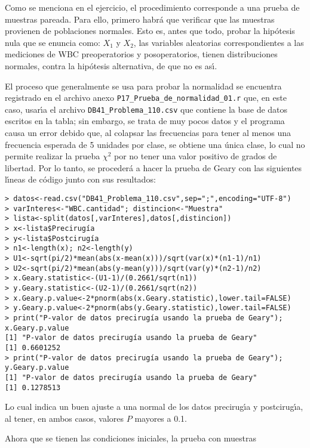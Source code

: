 \begin{solucion}
 Como se menciona en el ejercicio, el procedimiento corresponde
 a una prueba de muestras pareada.
 Para ello, primero habr\'a que verificar que las muestras provienen
 de poblaciones normales.
 Esto es, antes que todo, probar la hip\'otesis nula que se enuncia como: $X_1$ y $X_2$, las variables aleatorias correspondientes
 a las mediciones de WBC preoperatorios y posoperatorios,
 tienen distribuciones normales, contra la hip\'otesis alternativa,
 de que no es as\'{\i}.
 \par 
 El proceso que generalmente se usa para probar la normalidad 
 se encuentra registrado en el archivo anexo
 \texttt{P17\_Prueba\_de\_normalidad\_01.r}
 que, en este caso, usar\'{\i}a el archivo 
 \texttt{DB41\_Problema\_110.csv} que contiene la base de datos
 escritos en la tabla;
 sin embargo, se trata de muy pocos datos
 y el programa causa un error debido que,
 al colapsar las frecuencias para tener al menos una frecuencia esperada
 de 5 unidades por clase, se obtiene una \'unica clase,
 lo cual no permite realizar la prueba $\chi^2$
 por no tener una valor positivo de grados de libertad.
 Por lo tanto, se proceder\'a a hacer la prueba de Geary
 con las siguientes l\'{\i}neas de c\'odigo junto con sus resultados:
 \begin{verbatim}
> datos<-read.csv("DB41_Problema_110.csv",sep=";",encoding="UTF-8")
> varInteres<-"WBC.cantidad"; distincion<-"Muestra"
> lista<-split(datos[,varInteres],datos[,distincion])
> x<-lista$Precirugía
> y<-lista$Postcirugía
> n1<-length(x); n2<-length(y)
> U1<-sqrt(pi/2)*mean(abs(x-mean(x)))/sqrt(var(x)*(n1-1)/n1)
> U2<-sqrt(pi/2)*mean(abs(y-mean(y)))/sqrt(var(y)*(n2-1)/n2)
> x.Geary.statistic<-(U1-1)/(0.2661/sqrt(n1))
> y.Geary.statistic<-(U2-1)/(0.2661/sqrt(n2))
> x.Geary.p.value<-2*pnorm(abs(x.Geary.statistic),lower.tail=FALSE)
> y.Geary.p.value<-2*pnorm(abs(y.Geary.statistic),lower.tail=FALSE)
> print("P-valor de datos precirugía usando la prueba de Geary"); x.Geary.p.value
[1] "P-valor de datos precirugía usando la prueba de Geary"
[1] 0.6601252
> print("P-valor de datos precirugía usando la prueba de Geary"); y.Geary.p.value
[1] "P-valor de datos precirugía usando la prueba de Geary"
[1] 0.1278513
 \end{verbatim}
 \vspace{-0.5cm}
 Lo cual indica un buen ajuste a una normal de los datos precirug\'{\i}a
 y postcirug\'{\i}a, al tener, en ambos casos, valores $P$ mayores a 0.1.
 \par 
 Ahora que se tienen las condiciones iniciales, la prueba con muestras

\end{solucion}
